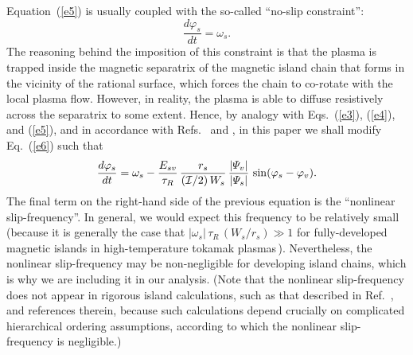 \documentclass[12pt,prb,aps]{revtex4-1}
\begin{document}
Equation~(\ref{e5}) is usually coupled with the so-called ``no-slip constraint'':\,\cite{rfa}
\begin{equation}\label{e6}
\frac{d\varphi_s}{dt} = \omega_s.
\end{equation}
The reasoning behind the imposition of this constraint is that the plasma is trapped inside the
magnetic separatrix of the magnetic island chain that forms in the vicinity of the rational surface,
which forces the chain to co-rotate with the local plasma flow. However, in reality, the plasma
is able to diffuse resistively across the separatrix to some extent. Hence, by analogy with Eqs.~(\ref{e3}), (\ref{e4}), and (\ref{e5}), and 
in accordance with Refs.~ and , in this paper we shall modify Eq.~(\ref{e6}) such that
\begin{equation}\label{e7}
\frac{d\varphi_s}{dt} = \omega_s - \frac{E_{sv}}{\tau_R}\,\frac{r_s}{({\cal I}/2)\,W_s}\,\frac{|{\mit\Psi}_v|}{|{\mit\Psi}_s|}\,\sin(\varphi_s-\varphi_v).
\end{equation}
The final term on the right-hand side of the previous equation is the ``nonlinear slip-frequency''. In general,
we would expect this frequency to be relatively small (because it is generally the case that $|\omega_s|\,\tau_R\,(W_s/r_s)\gg 1$
for fully-developed magnetic islands in high-temperature tokamak plasmas\,\cite{rf1,slip2}). Nevertheless, the
nonlinear slip-frequency may be non-negligible for developing island chains, which is why we are including it in our analysis.
(Note that the nonlinear slip-frequency does not appear in rigorous island calculations, such as
that described in Ref.~, and references therein, because such calculations depend crucially on
complicated hierarchical ordering assumptions, according to which the nonlinear slip-frequency is negligible.)
\end{document}
